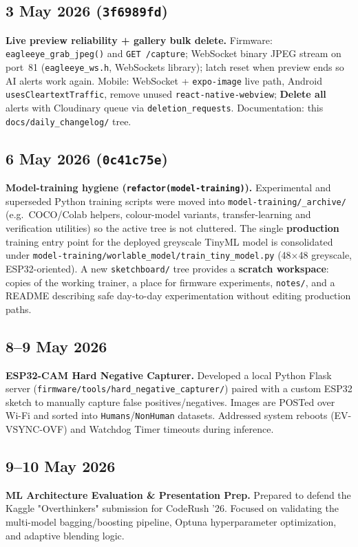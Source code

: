 \documentclass[11pt,a4paper]{article}
\begin{document}
\subsection{3 May 2026 (\texttt{3f6989fd})}
\textbf{Live preview reliability + gallery bulk delete.} Firmware: \texttt{eagleeye\_grab\_jpeg()} and \texttt{GET /capture}; WebSocket binary JPEG stream on port~81 (\texttt{eagleeye\_ws.h}, WebSockets library); latch reset when preview ends so AI alerts work again. Mobile: WebSocket + \texttt{expo-image} live path, Android \texttt{usesCleartextTraffic}, remove unused \texttt{react-native-webview}; \textbf{Delete all} alerts with Cloudinary queue via \texttt{deletion\_requests}. Documentation: this \texttt{docs/daily\_changelog/} tree.

\subsection{6 May 2026 (\texttt{0c41c75e})}
\textbf{Model-training hygiene (\texttt{refactor(model-training)}).} Experimental and superseded Python training scripts were moved into \texttt{model-training/\_archive/} (e.g.\ COCO/Colab helpers, colour-model variants, transfer-learning and verification utilities) so the active tree is not cluttered. The single \textbf{production} training entry point for the deployed greyscale TinyML model is consolidated under \texttt{model-training/worlable\_model/train\_tiny\_model.py} (48$\times$48 greyscale, ESP32-oriented). A new \texttt{sketchboard/} tree provides a \textbf{scratch workspace}: copies of the working trainer, a place for firmware experiments, \texttt{notes/}, and a README describing safe day-to-day experimentation without editing production paths.

\subsection{8--9 May 2026}
\textbf{ESP32-CAM Hard Negative Capturer.} Developed a local Python Flask server (\texttt{firmware/tools/hard\_negative\_capturer/}) paired with a custom ESP32 sketch to manually capture false positives/negatives. Images are POSTed over Wi-Fi and sorted into \texttt{Humans}/\texttt{NonHuman} datasets. Addressed system reboots (EV-VSYNC-OVF) and Watchdog Timer timeouts during inference.

\subsection{9--10 May 2026}
\textbf{ML Architecture Evaluation \& Presentation Prep.} Prepared to defend the Kaggle "Overthinkers" submission for CodeRush '26. Focused on validating the multi-model bagging/boosting pipeline, Optuna hyperparameter optimization, and adaptive blending logic.
\end{document}
